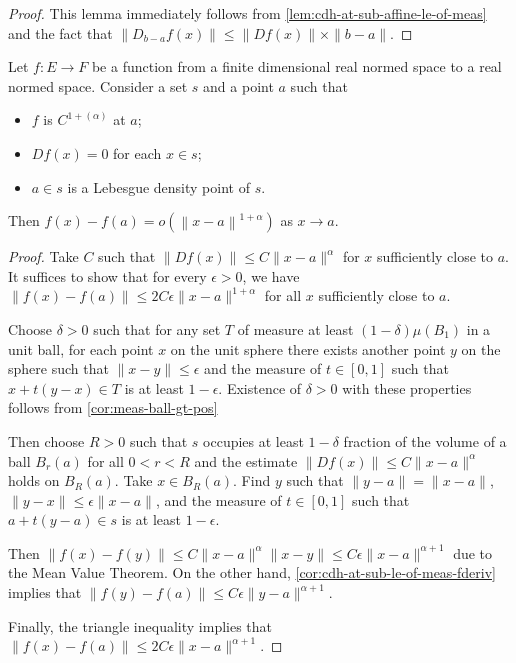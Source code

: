 \begin{proof}
  This lemma immediately follows from \autoref{lem:cdh-at-sub-affine-le-of-meas}
  and the fact that \(\|D_{b-a}f(x)\|\le \|Df(x)\|\times\|b - a\|\).
\end{proof}

\begin{corollary}%
  \label{cor:cdh-at-isLittleO-of-density}
  Let \(f\colon E \to F\) be a function from a finite dimensional real normed space to a real normed space.
  Consider a set \(s\) and a point \(a\) such that
  \begin{itemize}
  \item \(f\) is \(C^{1+(\alpha)}\) at \(a\);
  \item \(Df(x)=0\) for each \(x\in s\);
  \item \(a\in s\) is a Lebesgue density point of \(s\).
  \end{itemize}
  Then \(f(x)-f(a)=o\left(\left\|x - a\right\|^{1+\alpha}\right)\) as \(x\to a\).
\end{corollary}

\begin{proof}
  Take \(C\) such that \(\|Df(x)\|\le C\|x - a\|^{\alpha}\) for \(x\) sufficiently close to \(a\).
  It suffices to show that for every \(\epsilon > 0\),
  we have \(\|f(x) - f(a)\| \le 2C\epsilon\|x - a\|^{1+\alpha}\)
  for all \(x\) sufficiently close to \(a\).

  Choose \(\delta > 0\) such that for any set \(T\) of measure at least \((1-\delta)\mu(B_{1})\) in a unit ball,
  for each point \(x\) on the unit sphere there exists another point \(y\) on the sphere
  such that \(\|x - y\| \le \epsilon\)
  and the measure of \(t\in [0, 1]\) such that \(x+t(y - x)\in T\) is at least \(1 - \epsilon\).
  Existence of \(\delta > 0\) with these properties follows from \autoref{cor:meas-ball-gt-pos}

  Then choose \(R>0\) such that
  \(s\) occupies at least \(1-\delta\) fraction of the volume of a ball \(B_{r}(a)\) for all \(0 < r < R\)
  and the estimate \(\|Df(x)\|\le C\|x - a\|^{\alpha}\) holds on \(B_{R}(a)\).
  Take \(x\in B_{R}(a)\).
  Find \(y\) such that \(\|y - a\| = \|x - a\|\), \(\|y - x\| \le \epsilon\|x - a\|\),
  and the measure of \(t\in [0, 1]\) such that \(a + t(y - a)\in s\) is at least \(1 - \epsilon\).

  Then \(\|f(x) - f(y)\| \le C\|x - a\|^{\alpha}\|x - y\| \le C\epsilon\|x - a\|^{\alpha+1}\)
  due to the Mean Value Theorem.
  On the other hand, \autoref{cor:cdh-at-sub-le-of-meas-fderiv} implies that
  \(\|f(y) - f(a)\| \le C\epsilon\|y - a\|^{\alpha+1}\).

  Finally, the triangle inequality implies that \(\|f(x) - f(a)\| \le 2C\epsilon\|x - a\|^{\alpha+1}\).
\end{proof}

